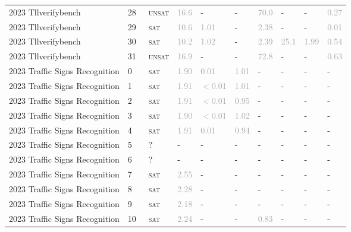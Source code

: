 \begin{center}
{\begin{longtable}{@{}llllllllll@{}}
2023 Tllverifybench & 28 & ~\textsc{unsat} & \textcolor{darkgray}{16.6} & - & - & \textcolor{darkgray}{70.0} & - & - & \textcolor{darkgray}{0.27} \\
2023 Tllverifybench & 29 & ~\textsc{sat} & \textcolor{darkgray}{10.6} & \textcolor{darkgray}{1.01} & - & \textcolor{darkgray}{2.38} & - & - & \textcolor{darkgray}{0.01} \\
2023 Tllverifybench & 30 & ~\textsc{sat} & \textcolor{darkgray}{10.2} & \textcolor{darkgray}{1.02} & - & \textcolor{darkgray}{2.39} & \textcolor{darkgray}{25.1} & \textcolor{darkgray}{1.99} & \textcolor{darkgray}{0.54} \\
2023 Tllverifybench & 31 & ~\textsc{unsat} & \textcolor{darkgray}{16.9} & - & - & \textcolor{darkgray}{72.8} & - & - & \textcolor{darkgray}{0.63} \\
\midrule
2023 Traffic Signs Recognition & 0 & ~\textsc{sat} & \textcolor{darkgray}{1.90} & \textcolor{darkgray}{0.01} & \textcolor{darkgray}{1.01} & - & - & - & - \\
2023 Traffic Signs Recognition & 1 & ~\textsc{sat} & \textcolor{darkgray}{1.91} & \textcolor{darkgray}{$<$0.01} & \textcolor{darkgray}{1.01} & - & - & - & - \\
2023 Traffic Signs Recognition & 2 & ~\textsc{sat} & \textcolor{darkgray}{1.91} & \textcolor{darkgray}{$<$0.01} & \textcolor{darkgray}{0.95} & - & - & - & - \\
2023 Traffic Signs Recognition & 3 & ~\textsc{sat} & \textcolor{darkgray}{1.90} & \textcolor{darkgray}{$<$0.01} & \textcolor{darkgray}{1.02} & - & - & - & - \\
2023 Traffic Signs Recognition & 4 & ~\textsc{sat} & \textcolor{darkgray}{1.91} & \textcolor{darkgray}{0.01} & \textcolor{darkgray}{0.94} & - & - & - & - \\
2023 Traffic Signs Recognition & 5 & ~? & - & - & - & - & - & - & - \\
2023 Traffic Signs Recognition & 6 & ~? & - & - & - & - & - & - & - \\
2023 Traffic Signs Recognition & 7 & ~\textsc{sat} & \textcolor{darkgray}{2.55} & - & - & - & - & - & - \\
2023 Traffic Signs Recognition & 8 & ~\textsc{sat} & \textcolor{darkgray}{2.28} & - & - & - & - & - & - \\
2023 Traffic Signs Recognition & 9 & ~\textsc{sat} & \textcolor{darkgray}{2.18} & - & - & - & - & - & - \\
2023 Traffic Signs Recognition & 10 & ~\textsc{sat} & \textcolor{darkgray}{2.24} & - & - & \textcolor{darkgray}{0.83} & - & - & - \\

\end{longtable}}
\end{center}
